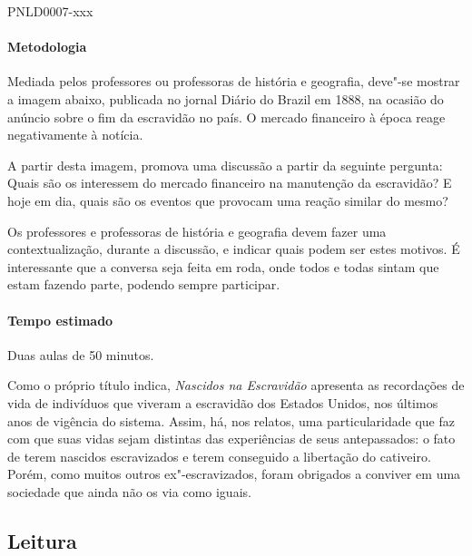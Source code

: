 \documentclass[11pt]{extarticle}
\begin{document}
\begin{enumerate}
\begin{enumerate}
\begin{enumerate}
 {PNLD0007-xxx}

\paragraph{Metodologia}

  Mediada pelos professores ou professoras de história e geografia, deve"-se mostrar a imagem abaixo,
  publicada no jornal Diário do Brazil em 1888, na ocasião do anúncio sobre o fim da escravidão no país.
  O mercado financeiro à época reage negativamente à notícia.
 

  A partir desta imagem, promova uma discussão a partir da seguinte pergunta: Quais são
  os interessem do mercado financeiro na manutenção da escravidão? E hoje em dia,
  quais são os eventos que provocam uma reação similar do mesmo?  

  Os professores e professoras de história e geografia devem fazer uma contextualização,
  durante a discussão, e indicar quais podem ser estes motivos. É interessante que a conversa
  seja feita em roda, onde todos e todas sintam que estam fazendo parte, podendo
  sempre participar.

  \paragraph{Tempo estimado} Duas aulas de 50 minutos.


Como o próprio título indica, \emph{Nascidos na Escravidão}
apresenta as recordações de vida de indivíduos que viveram a escravidão
dos Estados Unidos, nos últimos anos de vigência do sistema. Assim, há,
nos relatos, uma particularidade que faz com que suas vidas sejam
distintas das experiências de seus antepassados: o fato de terem
nascidos escravizados e terem conseguido a libertação do cativeiro.
Porém, como muitos outros ex"-escravizados, foram obrigados a conviver em
uma sociedade que ainda não os via como iguais.


\subsection{Leitura}


\end{enumerate}
\end{enumerate}
\end{enumerate}
\end{document}
